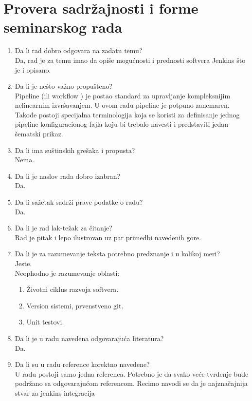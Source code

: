 \documentclass[a4paper]{report}
\begin{document}
\section{Provera sadržajnosti i forme seminarskog rada}

\begin{enumerate}
\item Da li rad dobro odgovara na zadatu temu?\\
  Da, rad je za temu imao da opiše mogućnosti i prednosti softvera Jenkins što je i opisano.
\item Da li je nešto važno propušteno?\\
  Pipeline (ili workflow ) je postao standard za upravljanje kompleksnijim nelinearnim
  izvršavanjem. U ovom radu pipeline je potpuno zanemaren. Takođe postoji specijalna
  terminologija koja se koristi za definisanje jednog pipeline konfiguracionog fajla koju bi trebalo
  navesti i predstaviti jedan šematski prikaz.
\item Da li ima suštinskih grešaka i propusta?\\
  Nema.
\item Da li je naslov rada dobro izabran?\\
  Da.
\item Da li sažetak sadrži prave podatke o radu?\\
  Da.
\item Da li je rad lak-težak za čitanje?\\
  Rad je pitak i lepo ilustrovan uz par primedbi navedenih gore.
\item Da li je za razumevanje teksta potrebno predznanje i u kolikoj meri?\\
  Jeste. \\
  Neophodno je razumevanje oblasti:
  \begin{enumerate}
      \item Životni ciklus razvoja softvera.
      \item Version sistemi, prvenstveno git.
      \item Unit testovi.
  \end{enumerate}
\item Da li je u radu navedena odgovarajuća literatura?\\
  Da.
\item Da li su u radu reference korektno navedene?\\
  U radu postoji samo jedna referenca. Potrebno je da svako veće tvrđenje bude podržano
  sa odgovarajućom referencom. Recimo navodi se da je najznačajnija stvar za jenkins integracija

\end{enumerate}
\end{document}
